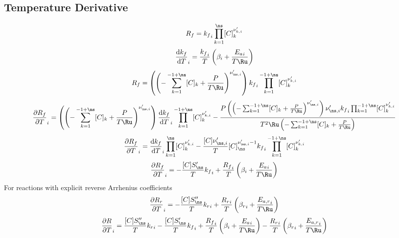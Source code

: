 \documentclass[a4paper,10pt]{article}
\begin{document}
\subsection{Temperature Derivative}
\begin{dmath} {R_f} = {k_f}_{i} \prod_{k=1}^{\ns} [C]_{k}^{\nu^{\prime}_{k,i}}\end{dmath} 
\begin{dmath} \frac{\text{d} {k_f} }{\text{d} T }_{i} = \frac{{k_f}_{i}}{T} \left(\beta_{i} + \frac{{E_{a}}_{i}}{T \Ru}\right)\end{dmath} 
\begin{dmath} {R_f} = \left(\left(- \sum_{k=1}^{-1 + \ns} [C]_{k} + \frac{P}{T \Ru}\right)^{\nu^{\prime}_{\ns,i}}\right) {k_f}_{i} \prod_{k=1}^{-1 + \ns} [C]_{k}^{\nu^{\prime}_{k,i}}\end{dmath} 
\begin{dmath} \frac{\partial {R_f} }{\partial T }_{i} = \left(\left(- \sum_{k=1}^{-1 + \ns} [C]_{k} + \frac{P}{T \Ru}\right)^{\nu^{\prime}_{\ns,i}}\right) \frac{\text{d} {k_f} }{\text{d} T }_{i} \prod_{k=1}^{-1 + \ns} [C]_{k}^{\nu^{\prime}_{k,i}} - \frac{P \left(\left(- \sum_{k=1}^{-1 + \ns} [C]_{k} + \frac{P}{T \Ru}\right)^{\nu^{\prime}_{\ns,i}}\right) \nu^{\prime}_{\ns,i} {k_f}_{i} \prod_{k=1}^{-1 + \ns} [C]_{k}^{\nu^{\prime}_{k,i}}}{T^{2} \Ru \left(- \sum_{k=1}^{-1 + \ns} [C]_{k} + \frac{P}{T \Ru}\right)}\end{dmath} 
\begin{dmath} \frac{\partial {R_f} }{\partial T }_{i} = \frac{\text{d} {k_f} }{\text{d} T }_{i} \prod_{k=1}^{\ns} [C]_{k}^{\nu^{\prime}_{k,i}} - \frac{[C] \nu^{\prime}_{\ns,i}}{T} [C]_{\ns}^{\nu^{\prime}_{\ns,i} - 1} {k_f}_{i} \prod_{k=1}^{-1 + \ns} [C]_{k}^{\nu^{\prime}_{k,i}}\end{dmath} 
\begin{dmath} \frac{\partial {R_f} }{\partial T }_{i} = - \frac{[C] S^{\prime}_{\ns}}{T} {k_f}_{i} + \frac{{R_f}_{i}}{T} \left(\beta_{i} + \frac{{E_{a}}_{i}}{T \Ru}\right)\end{dmath} 
For reactions with explicit reverse Arrhenius coefficients
\begin{dmath} \frac{\partial {R_r} }{\partial T }_{i} = - \frac{[C] S^{\prime\prime}_{\ns}}{T} {k_r}_{i} + \frac{{R_r}_{i}}{T} \left({\beta_r}_{i} + \frac{{E_{a,r}}_{i}}{T \Ru}\right)\end{dmath} 
\begin{dmath} \frac{\partial R }{\partial T }_{i} = \frac{[C] S^{\prime\prime}_{\ns}}{T} {k_r}_{i} - \frac{[C] S^{\prime}_{\ns}}{T} {k_f}_{i} + \frac{{R_f}_{i}}{T} \left(\beta_{i} + \frac{{E_{a}}_{i}}{T \Ru}\right) - \frac{{R_r}_{i}}{T} \left({\beta_r}_{i} + \frac{{E_{a,r}}_{i}}{T \Ru}\right)\end{dmath} 
\end{document}
